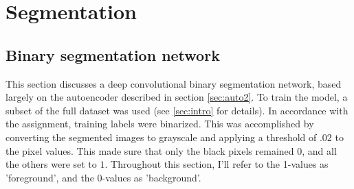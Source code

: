 

\section{Segmentation}
\label{sec:segm}


\subsection{Binary segmentation network}

This section discusses a deep convolutional binary segmentation network, based largely on the autoencoder described in section \textcolor{blue}{\ref{sec:auto2}}. To train the model, a subset of the full dataset was used (see \textcolor{blue}{\ref{sec:intro}} for details). In accordance with the assignment, training labels were binarized. This was accomplished by converting the segmented images to grayscale and applying a threshold of .02 to the pixel values. This made sure that only the black pixels remained $0$, and all the others were set to $1$. Throughout this section, I'll refer to the 1-values as 'foreground', and the 0-values as 'background'.

